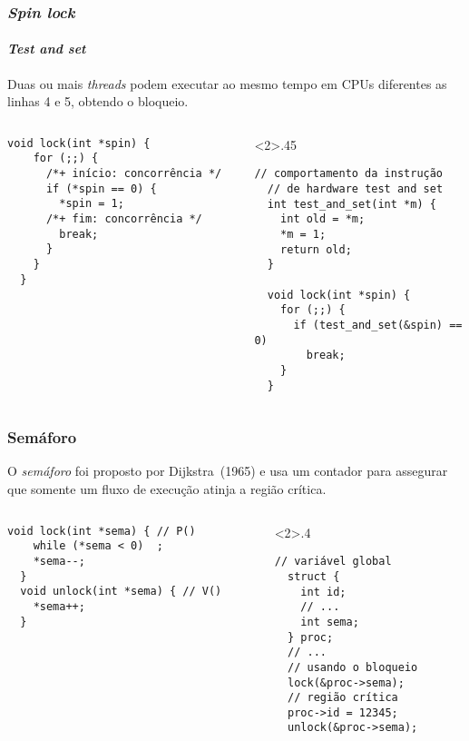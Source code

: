 \begin{frame}[fragile]
  \frametitle{{\em Spin lock}} \framesubtitle{{\em Test and set}}
  \small Duas ou mais {\em threads} podem executar ao mesmo tempo em
  CPUs diferentes as linhas 4 e 5, obtendo o bloqueio.
  
  \bigskip

  \begin{columns}
\begin{column}{.45\textwidth}
\begin{lstlisting}[framexleftmargin=5mm, frame=shadowbox,
    rulesepcolor=\color{red}]
  void lock(int *spin) {
    for (;;) {
      /*+ início: concorrência */
      if (*spin == 0) {
        *spin = 1;
      /*+ fim: concorrência */        
        break;
      }
    }
  }
\end{lstlisting}
\end{column}
\begin{column}<2>{.45\textwidth}
\begin{lstlisting}[framexleftmargin=5mm, frame=shadowbox,
    rulesepcolor=\color{blue},basicstyle={\scriptsize\color{blue}}]
  // comportamento da instrução
  // de hardware test and set
  int test_and_set(int *m) {
    int old = *m;
    *m = 1;
    return old;
  }
  
  void lock(int *spin) {
    for (;;) {
      if (test_and_set(&spin) == 0)
        break;
    }
  }
\end{lstlisting}
\end{column}
  \end{columns}
\end{frame}

\begin{frame}[fragile]
  \frametitle{Semáforo}
  \small O \alert{\em semáforo} foi proposto por Dijkstra~(1965)
  e usa um contador para assegurar que somente um fluxo de execução
  atinja a região crítica.
  \bigskip

  \begin{columns}
\begin{column}{.5\textwidth}
  \begin{lstlisting}[framexleftmargin=5mm,frame=shadowbox,
    rulesepcolor=\color{red}]
  void lock(int *sema) { // P()
    while (*sema < 0)  ;
    *sema--;
  }
  void unlock(int *sema) { // V()
    *sema++;
  }
\end{lstlisting}
\end{column}
\begin{column}<2>{.4\textwidth}
  \begin{lstlisting}[framexleftmargin=5mm, frame=shadowbox,
    rulesepcolor=\color{blue}]
  // variável global
  struct {
    int id;
    // ...
    int sema;
  } proc;
  // ...
  // usando o bloqueio  
  lock(&proc->sema);
  // região crítica
  proc->id = 12345;
  unlock(&proc->sema);
\end{lstlisting}
\end{column}
  \end{columns}
\end{frame}

